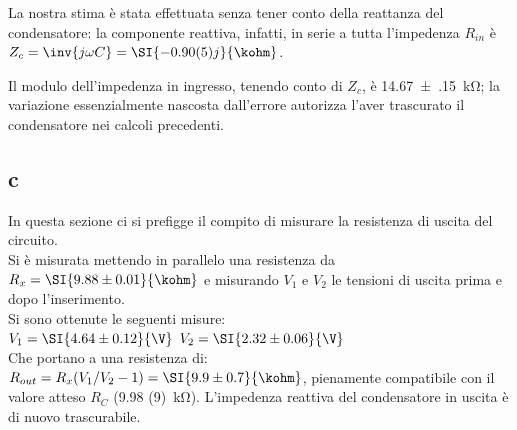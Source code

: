 La nostra stima è stata effettuata senza tener conto della reattanza del condensatore: la componente reattiva, infatti, in serie a tutta l'impedenza $R_{in}$ è $Z_c= \inv{j \omega C} = \SI{-0.90(5)j}{\kohm}$.

Il modulo dell'impedenza in ingresso, tenendo conto di $Z_c$, è \SI{14.67(15)}{\kohm}; la variazione essenzialmente nascosta dall'errore autorizza l'aver trascurato il condensatore nei calcoli precedenti.

\subsection{c}
In questa sezione ci si prefigge il compito di misurare la resistenza di uscita del circuito.\\
Si è misurata mettendo in parallelo una resistenza da $R_x=\SI{9.88\pm 0.01}{\kohm}$ e misurando $V_1$ e $V_2$ le tensioni di uscita prima e dopo l'inserimento.\\
Si sono ottenute le seguenti misure:\\
$V_1=\SI{4.64\pm 0.12 }{\V}$	$V_2=\SI{2.32\pm 0.06}{\V}$\\
Che portano a una resistenza di:\\
$R_{out}=R_x(V_1/V_2-1) = \SI{9.9 \pm 0.7}{\kohm}$, pienamente compatibile con il valore atteso $R_C$ (\SI{9.98 (9)}{\kohm}). L'impedenza reattiva del condensatore in uscita è di nuovo trascurabile.






